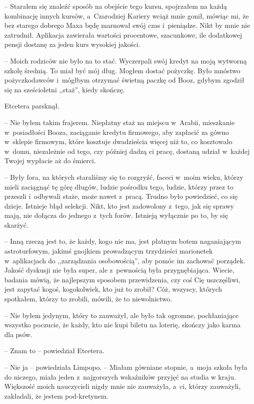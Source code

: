 \documentclass[oneside,polish,11pt,sfheadings]{mwbk}
\begin{document}
-- Starałem się znaleźć sposób na obejście tego kursu, spojrzałem na
każdą kombinację innych kursów, a~Czarodziej Kariery wciąż mnie gonił,
mówiąc mi, że bez starego dobrego Maxa będę marnował swój czas i~pieniądze. Nikt by mnie nie zatrudnił. Aplikacja zawierała wartości
procentowe, szacunkowe, ile dodatkowej pensji dostanę za jeden kurs
wysokiej jakości.

-- Moich rodziców nie było na to stać. Wyczerpali swój kredyt na moją
wytworną szkołę średnią. To miał być mój dług. Mogłem dostać pożyczkę.
Było mnóstwo pożyczkodawców i~mógłbym otrzymać świetną paczkę od Booz,
gdybym zgodził się na sześcioletni ,,staż'', kiedy skończę.

Etcetera parsknął.

-- Nie byłem takim frajerem. Niepłatny staż na miejscu w~Arabii,
mieszkanie w~posiadłości Booza, zaciąganie kredytu firmowego, aby
zapłacić za gówno w~sklepie firmowym, które kosztuje dwadzieścia więcej
niż to, co kosztowało w~domu, niezależnie od tego, czy później dadzą ci
pracę, dostaną udział w~każdej Twojej wypłacie aż do śmierci.

-- Były fora, na których staraliśmy się to rozgryźć, faceci w~moim wieku,
którzy mieli zaciągnąć tę górę długów, ludzie pośrodku tego, ludzie,
którzy przez to przeszli i~odbywali staże, może nawet z~pracą. Trudno
było powiedzieć, co się dzieje. Istnieje błąd selekcji. Nikt, kto jest
zadowolony z~tego, jak się sprawy mają, nie dołącza do jednego z~tych
forów. Istnieją wyłącznie po to, by się skarżyć.

-- Inną rzeczą jest to, że każdy, kogo nie ma, jest płatnym botem
naganiającym astroturfowym, jakimś gnojkiem prowadzącym trzydzieści
marionetek w~aplikacjach do ,,zarządzania osobowością'', aby pomóc im
zachować porządek. Jakość dyskusji nie była super, ale z~pewnością była
przygnębiająca. Wiecie, badania mówią, że najlepszym sposobem
przewidzenia, czy coś Cię uszczęśliwi, jest zapytać kogoś, kogokolwiek,
kto już to zrobił? Cóż, wszyscy, których spotkałem, którzy to zrobili,
mówili, że to niewolnictwo.

-- Nie byłem jedynym, który to zauważył, ale było tak ogromne,
pochłaniające wszystko poczucie, że każdy, kto nie kupi biletu na
loterię, skończy jako karma dla psów.

-- Znam to -- powiedział Etcetera.

-- Nie ja -- powiedziała Limpopo. -- Miałam gówniane stopnie, a~moja szkoła
była do niczego, miała jeden z~najgorszych wskaźników przyjęć na studia
w kraju. Większość moich nauczycieli nigdy mnie nie zauważyła, a~ci,
którzy zauważyli, zakładali, że jestem pod-kretynem.
\end{document}
